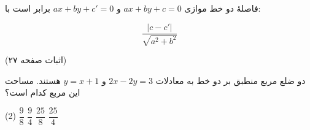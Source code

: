 
\begin{remark}[توجه]
    \noindent
    \begin{minipage}[c]{0.68\textwidth}
        \raggedleft
        فاصلۀ دو خط موازی
        \(
            ax+by+c=0
        \)
        و
        \(
            ax+by+c'=0
        \)
        برابر است با:
    \end{minipage}
    \hfill
    \begin{minipage}[c]{0.25\textwidth}
        \centering
        \[
            \frac{|c-c'|}{\sqrt{a^2+b^2}}
        \]
    \end{minipage}
\end{remark}

\begin{center}

\vspace{0.3\baselineskip}
{\small (اثبات صفحه ۲۷)}    
\end{center}

\begin{example}
    دو ضلع مربع منطبق بر دو خط به معادلات
    \(2x-2y=3\) و \(y=x+1\) هستند.
    مساحت این مربع کدام است؟

    \begin{tasks}(2)
        \task \(\dfrac{9}{8}\)
        \task \(\dfrac{9}{4}\)
        \task \(\dfrac{25}{8}\)
        \task \(\dfrac{25}{4}\)
    \end{tasks}
\end{example}



